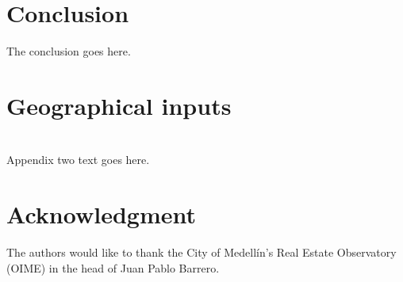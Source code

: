 \documentclass[journal]{IEEEtran}
\begin{document}
\section{Conclusion}
The conclusion goes here.






%


\appendices
\section{Geographical inputs}



\section{}
Appendix two text goes here.


\section*{Acknowledgment}


The authors would like to thank the City of Medellín's Real Estate Observatory (OIME) in the head of Juan Pablo Barrero. 
\end{document}
